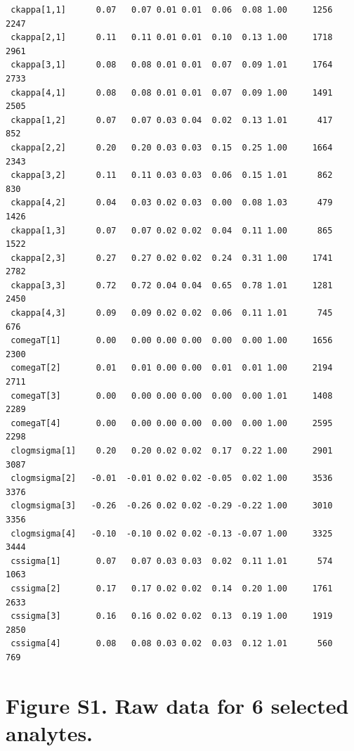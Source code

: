\documentclass[
]{article}
\begin{document}
\begin{verbatim}
 ckappa[1,1]      0.07   0.07 0.01 0.01  0.06  0.08 1.00     1256     2247
 ckappa[2,1]      0.11   0.11 0.01 0.01  0.10  0.13 1.00     1718     2961
 ckappa[3,1]      0.08   0.08 0.01 0.01  0.07  0.09 1.01     1764     2733
 ckappa[4,1]      0.08   0.08 0.01 0.01  0.07  0.09 1.00     1491     2505
 ckappa[1,2]      0.07   0.07 0.03 0.04  0.02  0.13 1.01      417      852
 ckappa[2,2]      0.20   0.20 0.03 0.03  0.15  0.25 1.00     1664     2343
 ckappa[3,2]      0.11   0.11 0.03 0.03  0.06  0.15 1.01      862      830
 ckappa[4,2]      0.04   0.03 0.02 0.03  0.00  0.08 1.03      479     1426
 ckappa[1,3]      0.07   0.07 0.02 0.02  0.04  0.11 1.00      865     1522
 ckappa[2,3]      0.27   0.27 0.02 0.02  0.24  0.31 1.00     1741     2782
 ckappa[3,3]      0.72   0.72 0.04 0.04  0.65  0.78 1.01     1281     2450
 ckappa[4,3]      0.09   0.09 0.02 0.02  0.06  0.11 1.01      745      676
 comegaT[1]       0.00   0.00 0.00 0.00  0.00  0.00 1.00     1656     2300
 comegaT[2]       0.01   0.01 0.00 0.00  0.01  0.01 1.00     2194     2711
 comegaT[3]       0.00   0.00 0.00 0.00  0.00  0.00 1.01     1408     2289
 comegaT[4]       0.00   0.00 0.00 0.00  0.00  0.00 1.00     2595     2298
 clogmsigma[1]    0.20   0.20 0.02 0.02  0.17  0.22 1.00     2901     3087
 clogmsigma[2]   -0.01  -0.01 0.02 0.02 -0.05  0.02 1.00     3536     3376
 clogmsigma[3]   -0.26  -0.26 0.02 0.02 -0.29 -0.22 1.00     3010     3356
 clogmsigma[4]   -0.10  -0.10 0.02 0.02 -0.13 -0.07 1.00     3325     3444
 cssigma[1]       0.07   0.07 0.03 0.03  0.02  0.11 1.01      574     1063
 cssigma[2]       0.17   0.17 0.02 0.02  0.14  0.20 1.00     1761     2633
 cssigma[3]       0.16   0.16 0.02 0.02  0.13  0.19 1.00     1919     2850
 cssigma[4]       0.08   0.08 0.03 0.02  0.03  0.12 1.01      560      769
\end{verbatim}

\newpage{}

\hypertarget{figure-s1.-raw-data-for-6-selected-analytes.}{%
\section{Figure S1. Raw data for 6 selected
analytes.}\label{figure-s1.-raw-data-for-6-selected-analytes.}}
\end{document}
